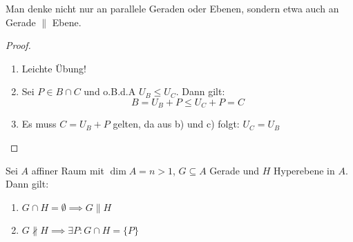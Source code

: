 \documentclass[parskip,a4paper,twoside,DIV15,BCOR12mm]{scrbook}
\begin{document}
\begin{example}
Man denke nicht nur an parallele Geraden oder Ebenen, sondern etwa auch an Gerade $\parallel$ Ebene.
\end{example}

\begin{comment}
\begin{enumerate}
\item Auf den Teilräumen einer festen Dimension ist Parallelität eine Äquivalenzrelation.
\item Aus $B\parallel C$ folgt: $(B\subseteq C) \vee (B\supseteq C) \vee (B\cap C=\emptyset)$
\item Für alle $P\in A$ und alle affinen Teilräume $B\ne\emptyset$ existiert genau ein affiner Teilraum
$C$ mit:
\begin{enumerate}[(a)]
\item $P\in C$
\item $B\parallel C$
\item $\dim{C}=\dim{B}$
\end{enumerate}
\end{enumerate}
\end{comment}

\begin{proof}
\begin{enumerate}
\item Leichte Übung!
\item Sei $P\in B\cap C$ und o.B.d.A $U_B\le U_C$. Dann gilt:
\[B=U_B+P\le U_C+P=C\]
\item Es muss $C=U_B+P$ gelten, da aus b) und c) folgt: $U_C=U_B$
\end{enumerate}
\end{proof}

\begin{theo}
\label{Satz 20.3}
Sei $A$ affiner Raum mit $\dim{A}=n>1$, $G\subseteq A$ Gerade und $H$ Hyperebene in $A$.\\
Dann gilt:
\begin{enumerate}
\item $G\cap H=\emptyset \implies G\parallel H$
\item $G\not\parallel H \implies \exists P: G\cap H=\{P\}$
\end{enumerate}
\end{theo}

\begin{comment}
$\dim{G\cap H}\le\dim{G}=1 \implies G\cap H=\begin{cases}
\emptyset\\
\text{Punkt}\\
\text{Gerade}
\end{cases}$
\end{comment}
\end{document}
